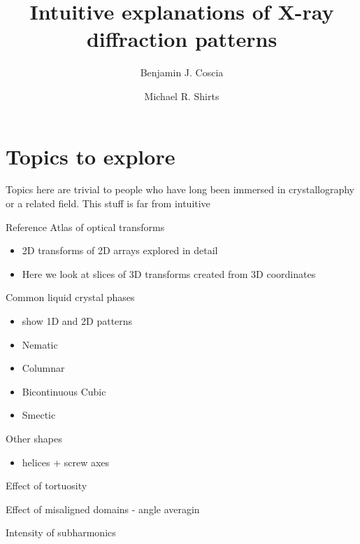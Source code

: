 \documentclass{article}
\title{Intuitive explanations of X-ray diffraction patterns}
\author{Benjamin J. Coscia \and Michael R. Shirts}
\begin{document}
  
  \graphicspath{{./figures/}}
  \maketitle

  \section{Topics to explore}

  Topics here are trivial to people who have long been immersed in crystallography or a related field. This stuff is far from intuitive 

  Reference Atlas of optical transforms
  \begin{itemize}
  	\item 2D transforms of 2D arrays explored in detail
	\item Here we look at slices of 3D transforms created from 3D coordinates
  \end{itemize}

	\item Common liquid crystal phases
	\begin{itemize}
		\item show 1D and 2D patterns
		\item Nematic
		\item Columnar
		\item Bicontinuous Cubic
		\item Smectic
	\end{itemize}
	\item Other shapes
	\begin{itemize}
		\item helices + screw axes
	\end{itemize}			
	\item Effect of tortuosity
	\item Effect of misaligned domains - angle averagin
	\item Intensity of subharmonics
\end{document}
